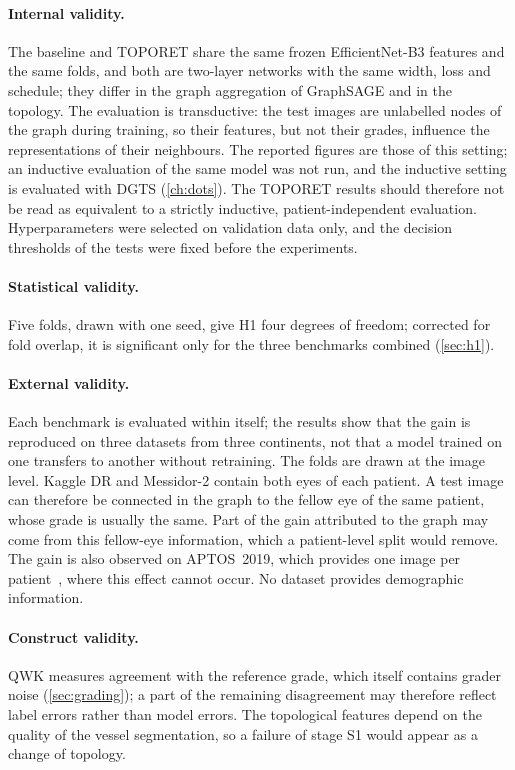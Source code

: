 \paragraph{Internal validity.}
The baseline and TOPORET share the same frozen EfficientNet-B3 features and the same
folds, and both are two-layer networks with the same width, loss and schedule; they differ
in the graph aggregation of GraphSAGE and in the topology. The evaluation is
transductive: the test images are unlabelled nodes of the graph during training, so their
features, but not their grades, influence the representations of their neighbours. The
reported figures are those of this setting; an inductive evaluation of the same model was
not run, and the inductive setting is evaluated with DGTS (\cref{ch:dots}). The TOPORET
results should therefore not be read as equivalent to a strictly inductive,
patient-independent evaluation. Hyperparameters were selected
on validation data only, and the decision thresholds of the tests were fixed before the
experiments.

\paragraph{Statistical validity.}
Five folds, drawn with one seed, give H1 four degrees of freedom; corrected for fold
overlap, it is significant only for the three benchmarks combined (\cref{sec:h1}).

\paragraph{External validity.}
Each benchmark is evaluated within itself; the results show that the gain is reproduced on
three datasets from three continents, not that a model trained on one transfers to another
without retraining. The folds are drawn at the image level. Kaggle DR and Messidor-2 contain both eyes of each patient. A test image can therefore be
connected in the graph to the fellow eye of the same patient, whose grade is usually the
same. Part of the gain attributed to the graph may come from this fellow-eye information,
which a patient-level split would remove. The gain is also observed on APTOS~2019, which provides
one image per patient~\cite{belhadj2026dgts}, where this effect cannot occur. No dataset
provides demographic information.

\paragraph{Construct validity.}
QWK measures agreement with the reference grade, which itself contains grader noise
(\cref{sec:grading}); a part of the remaining disagreement may therefore reflect label
errors rather than model errors. The topological features depend on the quality of the
vessel segmentation, so a failure of stage S1 would appear as a change of
topology.


